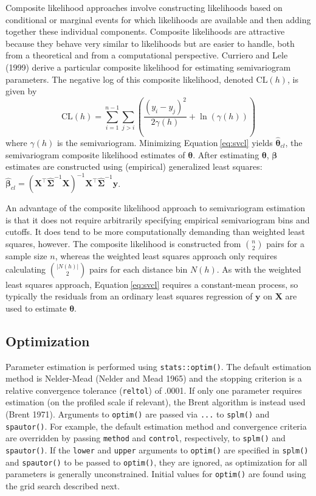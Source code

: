 \documentclass{article}
\begin{document}
Composite likelihood approaches involve constructing likelihoods based
on conditional or marginal events for which likelihoods are available
and then adding together these individual components. Composite
likelihoods are attractive because they behave very similar to
likelihoods but are easier to handle, both from a theoretical and from a
computational perspective. Curriero and Lele (1999) derive a particular
composite likelihood for estimating semivariogram parameters. The
negative log of this composite likelihood, denoted \(\text{CL}(h)\), is
given by \begin{equation}\label{eq:svcl}
  \text{CL}(h) = \sum_{i = 1}^{n - 1} \sum_{j > i} \left( \frac{(y_i - y_j)^2}{2\gamma(h)} + \ln(\gamma(h)) \right)
\end{equation} where \(\gamma(h)\) is the semivariogram. Minimizing
Equation\(~\)\ref{eq:svcl} yields \(\boldsymbol{\hat{\theta}}_{cl}\),
the semivariogram composite likelihood estimates of
\(\boldsymbol{\theta}\). After estimating \(\boldsymbol{\theta}\),
\(\boldsymbol{\beta}\) estimates are constructed using (empirical)
generalized least squares:
\(\boldsymbol{\hat{\beta}}_{cl} = (\mathbf{X}^\top \hat{\mathbf{\Sigma}}^{-1} \mathbf{X})^{-1} \mathbf{X}^\top \hat{\mathbf{\Sigma}}^{-1} \mathbf{y}\).

An advantage of the composite likelihood approach to semivariogram
estimation is that it does not require arbitrarily specifying empirical
semivariogram bins and cutoffs. It does tend to be more computationally
demanding than weighted least squares, however. The composite likelihood
is constructed from \(\binom{n}{2}\) pairs for a sample size \(n\),
whereas the weighted least squares approach only requires calculating
\(\binom{|N(h)|}{2}\) pairs for each distance bin \(N(h)\). As with the
weighted least squares approach, Equation\(~\)\ref{eq:svcl} requires a
constant-mean process, so typically the residuals from an ordinary least
squares regression of \(\mathbf{y}\) on \(\mathbf{X}\) are used to
estimate \(\boldsymbol{\theta}\).

\hypertarget{optimization}{%
\subsection{Optimization}\label{optimization}}

Parameter estimation is performed using \texttt{stats::optim()}. The
default estimation method is Nelder-Mead (Nelder and Mead 1965) and the
stopping criterion is a relative convergence tolerance (\texttt{reltol})
of .0001. If only one parameter requires estimation (on the profiled
scale if relevant), the Brent algorithm is instead used (Brent 1971).
Arguments to \texttt{optim()} are passed via \texttt{...} to
\texttt{splm()} and \texttt{spautor()}. For example, the default
estimation method and convergence criteria are overridden by passing
\texttt{method} and \texttt{control}, respectively, to \texttt{splm()}
and \texttt{spautor()}. If the \texttt{lower} and \texttt{upper}
arguments to \texttt{optim()} are specified in \texttt{splm()} and
\texttt{spautor()} to be passed to \texttt{optim()}, they are ignored,
as optimization for all parameters is generally unconstrained. Initial
values for \texttt{optim()} are found using the grid search described
next.
\end{document}
